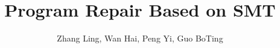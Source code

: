 \documentclass[preprint]{elsarticle}
\theoremstyle{definition}
\begin{document}
\title{Program Repair Based on SMT}
\author{Zhang Ling, Wan Hai, Peng Yi, Guo BoTing}
\address{School of Data Science and Computer, Sun Yat-sen University, Guangzhou, China}









\begin{appendices}

\end{appendices}

\newpage
{}

\end{document}
